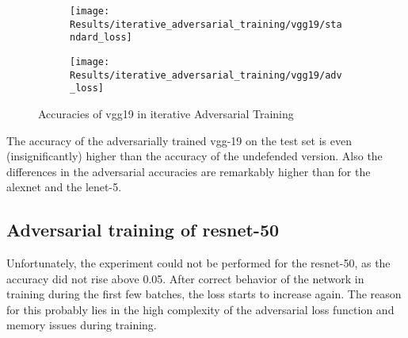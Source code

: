 \documentclass[draft,final]{vutinfth} %
\begin{document}
\begin{figure}[h]
  \begin{subfigure}[b]{0.5\columnwidth}
		\centering
    \texttt{[image: Results/iterative\_adversarial\_training/vgg19/standard\_loss]}
    \label{fig:exp:iat:alex:data}
  \end{subfigure}
  \begin{subfigure}[b]{0.5\columnwidth}
		\centering
    \texttt{[image: Results/iterative\_adversarial\_training/vgg19/adv\_loss]}
    \label{fig:exp:iat:alex:loss}
  \end{subfigure}
  \caption{Accuracies of vgg19 in iterative Adversarial Training}
\end{figure}

\begin{table}[h]
	\noindent{}
		\caption{Accuracies during training with adversarial loss}
\end{table}

The accuracy of the adversarially trained vgg-19 on the test set is even (insignificantly) higher than the accuracy of the undefended version.
Also the differences in the adversarial accuracies are remarkably higher than for the alexnet and the lenet-5.

\FloatBarrier
\subsection{Adversarial training of resnet-50}
Unfortunately, the experiment could not be performed for the resnet-50, as the accuracy did not rise above 0.05.
After correct behavior of the network in training during the first few batches, the loss starts to increase again.
The reason for this probably lies in the high complexity of the adversarial loss function and memory issues during training.
\end{document}
